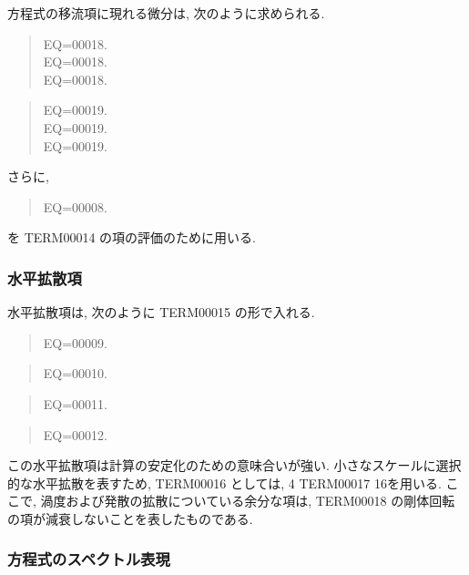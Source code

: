 方程式の移流項に現れる微分は,
次のように求められる.
%
\begin{quote}
\label{A積分}
\nonumber
EQ=00018.\\
\nonumber
EQ=00018.\\
EQ=00018.
\end{quote}
%
\begin{quote}
\label{B積分}
\nonumber
EQ=00019.\\
\nonumber
EQ=00019.\\
EQ=00019.
\end{quote}
%
さらに,
\begin{quote}
EQ=00008.
\end{quote}
を TERM00014 の項の評価のために用いる.

\subsubsection{水平拡散項}

水平拡散項は, 次のように TERM00015 の形で入れる.
%
\begin{quote}
EQ=00009.
\label{水平拡散}
\end{quote}
%
\begin{quote}
EQ=00010.
\end{quote}
%
\begin{quote}
EQ=00011.
\end{quote}
%
\begin{quote}
EQ=00012.
\end{quote}
%
この水平拡散項は計算の安定化のための意味合いが強い.
小さなスケールに選択的な水平拡散を表すため,
TERM00016 としては, 4 TERM00017 16を用いる.
ここで, 渦度および発散の拡散についている余分な項は,
TERM00018 の剛体回転の項が減衰しないことを表したものである.

\subsubsection{方程式のスペクトル表現}


